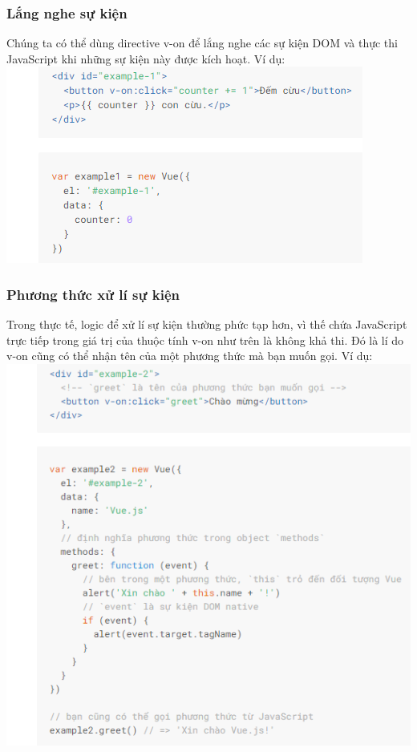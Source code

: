 \documentclass[12pt,a4paper]{report}
\begin{document}
\subsubsection{Lắng nghe sự kiện} Chúng ta có thể dùng directive v-on để lắng nghe các sự kiện DOM và thực thi JavaScript khi những sự kiện này được kích hoạt. Ví dụ:\\\includegraphics[scale=1]{54}
\subsubsection{Phương thức xử lí sự kiện}Trong thực tế, logic để xử lí sự kiện thường phức tạp hơn, vì thế chứa JavaScript trực tiếp trong giá trị của thuộc tính v-on như trên là không khả thi. Đó là lí do v-on cũng có thể nhận tên của một phương thức mà bạn muốn gọi. Ví dụ:\\\includegraphics[scale=1]{55}
\end{document}
